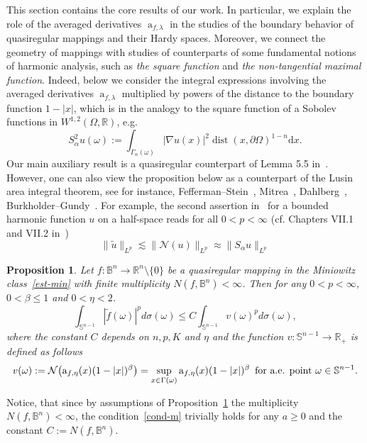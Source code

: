\documentclass[11pt,a4paper,reqno]{amsart}
\newtheorem{prop}[theorem]{Proposition}
\theoremstyle{definition}
\renewcommand{\a}{\operatorname{a}}
\newcommand{\Om}{\Omega}
\newcommand{\om}{\omega}
\newcommand{\B}{\mathbb{B}^n}
\newcommand{\Nm}{\mathcal{N}}
\newcommand{\R}{\mathbb{R}}
\newcommand{\ud}{\mathrm {d}}
\newcommand{\dist}{\operatorname{dist}}
\newcommand{\Sn}{\mathbb{S}^{n-1}}
\newcommand{\blue}{\color{blau}}
\newcounter{komcounter}
\numberwithin{komcounter}{section}
\newcommand{\komT}[1]{{\bf \blue [\refstepcounter{komcounter}\thekomcounter (by T): #1]}}
\begin{document}
This section contains the core results of our work. In particular, we explain the role of the averaged derivatives $\a_{f,\lambda}$ in the studies of the boundary behavior of quasiregular mappings and their Hardy spaces. Moreover, we connect the geometry of mappings with studies of counterparts of some fundamental notions of harmonic analysis, such as \emph{the square function} and \emph{the non-tangential maximal function}. Indeed, below we consider the integral expressions involving the averaged derivatives $\a_{f,\lambda}$ multiplied by powers of the distance to the boundary function $1-|x|$, which is in the analogy to the square function of a Sobolev functions in $W^{1,2}(\Om,\R)$, e.g.
\[
 S_{\alpha}^2 u(\om):=\int_{\Gamma_{\alpha}(\om)} |\nabla u(x)|^2 \dist(x,\partial \Om)^{1-n}\ud x.
\] 
Our main auxiliary result is a quasiregular counterpart of Lemma 5.5 in~\cite{ak}. However, one can also view the proposition below as a counterpart of the Lusin area integral theorem, see for instance, Fefferman--Stein~\cite{fst}, Mitrea~\cite{mit}, Dahlberg~\cite{dah}, Burkholder--Gundy~\cite{bg}. For example, the second assertion in~\cite[Theorem 8 ]{fst} for a bounded harmonic function $u$ on a half-space reads for all $0<p<\infty$ (cf. Chapters VII.1 and VII.2 in~\cite{stein})
\[
\|\tilde{u}\|_{L^p}\lesssim \|\Nm(u)\|_{L^p} \approx \|S_\alpha u\|_{L^p}
\]
\begin{prop}\label{prop:Lp-norm-bound}
	Let $f:\B\rightarrow \R^n\setminus\{ 0\}$ be a quasiregular mapping in the Miniowitz class~\eqref{est-min} with finite multiplicity $N(f,\B)<\infty$. Then for any $0<p<\infty$, $0<\beta\leq 1$ and $0<\eta <2$. 
\begin{equation}\label{assert:Lp-norm-bound}
	 \int_{\Sn}|\tilde{f}(\om)|^pd\sigma (\om)\leq C \int_{\Sn}v(\om)^pd\sigma (\om),
\end{equation}
where the constant $C$ depends on $n,p, K$ and $\eta$ and the function $v:\Sn \to \R_{+}$ is defined as follows
	$$
	 v(\om):=\Nm\big(\mathrm a_{f,\eta} (x)(1-|x|)^\beta\big)= \displaystyle\sup_{x\in \Gamma (\om)}\mathrm a_{f,\eta} (x)(1-|x|)^\beta\,\hbox{ for a.e. point }\om\in \Sn.
	 $$
\end{prop}
Notice, that since by assumptions of Proposition~\ref{prop:Lp-norm-bound} the multiplicity $N(f,\B)<\infty$, the condition~\eqref{cond-m} trivially holds for any $a\geq 0$ and the constant $C:=N(f,\B)$.
\end{document}
